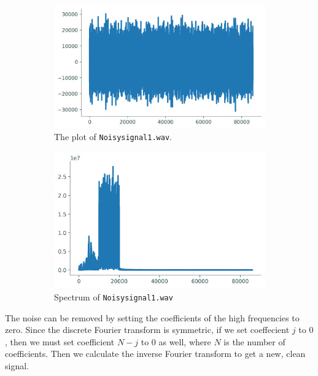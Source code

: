 \begin{figure}
\captionsetup[subfigure]{justification=centering}
\centering
\begin{subfigure}{.5\textwidth}
    \centering
    \includegraphics[width=\linewidth]{figures/noisy.png}
    \caption{The plot of \texttt{Noisysignal1.wav}.}
    \label{fig:noisysignal}
\end{subfigure}%
\begin{subfigure}{.5\textwidth}
    \centering
    \includegraphics[width=\linewidth]{figures/noisyspec.png}
    \caption{Spectrum of \texttt{Noisysignal1.wav}}
    \label{fig:noisyspec}
\end{subfigure}
\caption{}
\end{figure}

The noise can be removed by setting the coefficients of the high frequencies to zero.
Since the discrete Fourier transform is symmetric, if we set coeffecient $j$ to $0$, then we must set coefficient $N - j$ to $0$ as well, where $N$ is the number of coefficients.
Then we calculate the inverse Fourier transform to get a new, clean signal.

